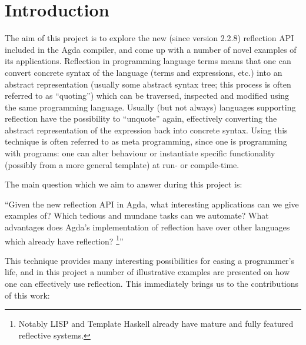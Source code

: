 \section{Introduction}

The aim of this project is to explore the new (since version 2.2.8) reflection API included in the Agda
compiler, and come up with a number of novel examples of its applications. Reflection in programming language
terms means that one can convert concrete syntax of the language (terms and expressions, etc.) into an abstract
representation (usually some abstract syntax tree; this process is often referred to as ``quoting'')
which can be traversed, inspected and modified using the same programming
language. Usually (but not always) languages supporting reflection have the possibility to
``unquote'' again, effectively
converting the abstract representation of the expression back into concrete syntax. Using this technique is often referred to as meta programming,
since one is programming with programs: one can alter behaviour
or instantiate specific functionality (possibly from a more general template) at run- or compile-time.

The main question which we aim to answer during this project is:

``Given the new reflection API in Agda, what interesting applications can we give
examples of? Which tedious and mundane tasks can we automate? What advantages does
Agda's implementation of reflection have over other languages which already have reflection?
\footnote{Notably LISP and Template Haskell already have mature and fully featured reflective systems.}''

This technique provides many interesting possibilities for easing a programmer's life, and in
this project a number of illustrative
examples are presented on how one can effectively use reflection.
This immediately brings us to the contributions of this work:

